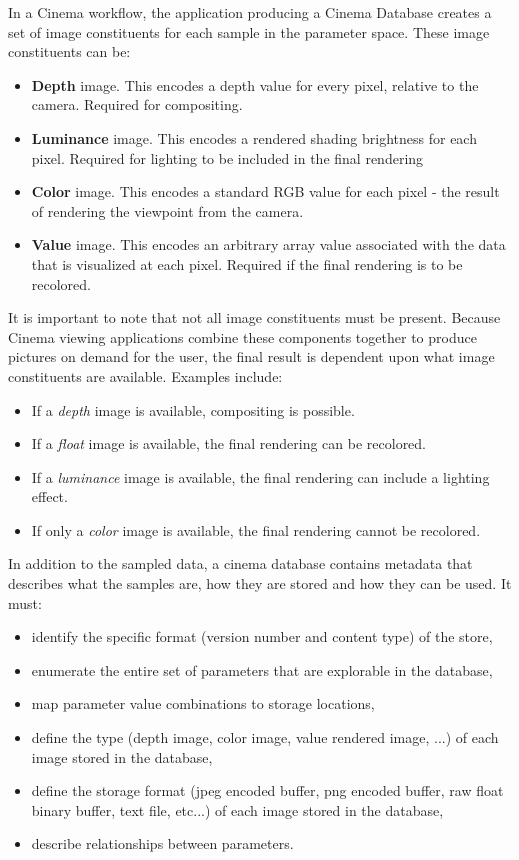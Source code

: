 \documentclass{article}
\begin{document}
In a Cinema workflow, the application producing a Cinema Database creates a set of image constituents for each sample in the parameter space. These image constituents can be:
\begin{itemize}
\item \textbf{Depth} image. This encodes a depth value for every pixel, relative to the camera. Required for compositing.
\item \textbf{Luminance} image. This encodes a rendered shading brightness for each pixel. Required for lighting to be included in the final rendering
\item \textbf{Color} image. This encodes a standard RGB value for each pixel - the result of rendering the viewpoint from the camera.
\item \textbf{Value} image. This encodes an arbitrary array value associated with the data that is visualized at each pixel. Required if the final rendering is to be recolored.
\end{itemize}

It is important to note that not all image constituents must be present. Because Cinema viewing applications combine these components together to produce pictures on demand for the user, the final result is dependent upon what image constituents are available. Examples include:
\begin{itemize}
\item If a \textit{depth} image is available, compositing is possible.
\item If a \textit{float} image is available, the final rendering can be recolored.
\item If a \textit{luminance} image is available, the final rendering can include a lighting effect.
\item If only a \textit{color} image is available, the final rendering cannot be recolored.
\end{itemize}

In addition to the sampled data, a cinema database contains metadata that describes what the samples are, how they are stored and how they can be used. It must:
\begin{itemize}
\item identify the specific format (version number and content type) of the store,
\item enumerate the entire set of parameters that are explorable in the database,
\item map parameter value combinations to storage locations,
\item define the type (depth image, color image, value rendered image, ...) of each image stored in the database,
\item define the storage format (jpeg encoded buffer, png encoded buffer, raw float binary buffer, text file, etc...) of each image stored in the database,
\item describe relationships between parameters.
\end{itemize}
\end{document}
